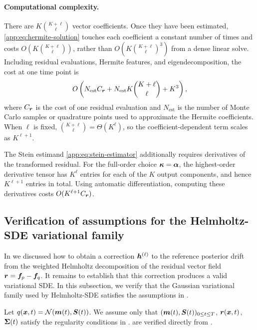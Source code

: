 \paragraph{Computational complexity.}
There are $K\binom{K+\ell}{\ell}$ vector coefficients.
Once they have been estimated, \cref{app:eq:hermite-solution} touches each coefficient a constant number of times and costs $O(K\binom{K+\ell}{\ell})$, rather than $O(K \binom{K+\ell}{\ell}^3)$ from a dense linear solve.
Including residual evaluations, Hermite features, and eigendecomposition, the cost at one time point is
\begin{equation*}
O\left(N_{\mathrm{est}}C_{\boldsymbol{r}} + N_{\mathrm{est}} K\binom{K+\ell}{\ell}+K^3\right),
\end{equation*}
where $C_{\boldsymbol{r}}$ is the cost of one residual evaluation and $N_{\mathrm{est}}$ is the number of Monte Carlo samples or quadrature points used to approximate the Hermite coefficients.
When $\ell$ is fixed, $\binom{K+\ell}{\ell} = \Theta(K^{\ell})$, so the coefficient-dependent term scales as $K^{\ell+1}$.

The Stein estimand \cref{app:eq:stein-estimator} additionally requires derivatives of the transformed residual.
For the full-order choice $\boldsymbol{\kappa}=\boldsymbol{\alpha}$, the highest-order derivative tensor has $K^\ell$ entries for each of the $K$ output components, and hence $K^{\ell+1}$ entries in total.
Using automatic differentiation, computing these derivatives costs $O(K^{\ell+1} C_{\boldsymbol{r}})$.

\subsection{Verification of assumptions for the Helmholtz-SDE variational family}
\label{app:subsec:verify-assumptions}

In  we discussed how to obtain a correction $\boldsymbol{h}^{(\ell)}$ to the reference posterior drift from the weighted Helmholtz decomposition of the residual vector field $\boldsymbol{r} = \boldsymbol{f}_p - \boldsymbol{f}_q$.
It remains to establish that this correction produces a valid variational SDE.
In this subsection, we verify that the Gaussian variational family used by Helmholtz-SDE satisfies the assumptions in .

Let $q(\boldsymbol{x},t)=\mathcal{N}(\boldsymbol{m}(t),\boldsymbol{S}(t))$.
We assume only that $(\boldsymbol{m}(t),\boldsymbol{S}(t))_{0 \leq t \leq T}$, $\boldsymbol{r}(\boldsymbol{x}, t)$, $\boldsymbol{\Sigma}(t)$ satisfy the regularity conditions in .  are verified directly from .

